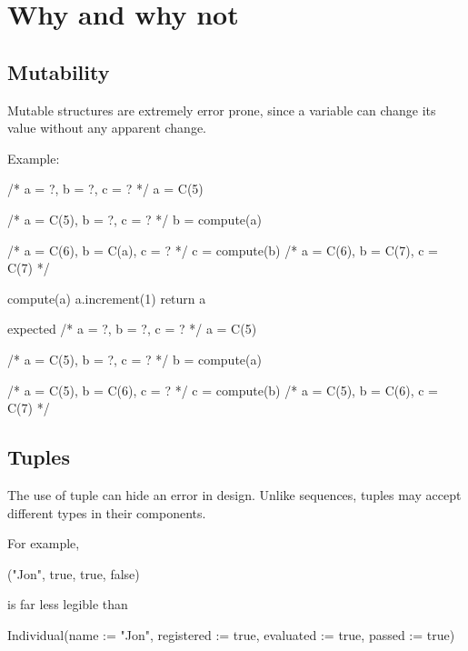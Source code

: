 \section{Why and why not}


\subsection{Mutability}
Mutable structures are extremely error prone, since a variable can change its value without any apparent change.

Example:

/* a = ?, b = ?, c = ? */
a = C(5)

/* a = C(5), b = ?, c = ? */
b = compute(a)

/* a = C(6), b = C(a), c = ? */
c = compute(b)
/* a = C(6), b = C(7), c = C(7) */


compute(a)
a.increment(1)
return a


expected
/* a = ?, b = ?, c = ? */
a = C(5)

/* a = C(5), b = ?, c = ? */
b = compute(a)

/* a = C(5), b = C(6), c = ? */
c = compute(b)
/* a = C(5), b = C(6), c = C(7) */



\subsection{Tuples}

The use of tuple can hide an error in design.
Unlike sequences, tuples may accept different types in their components.

For example,

("Jon", true, true, false)

is far less legible than

Individual(name := "Jon", registered := true, evaluated := true, passed := true)



